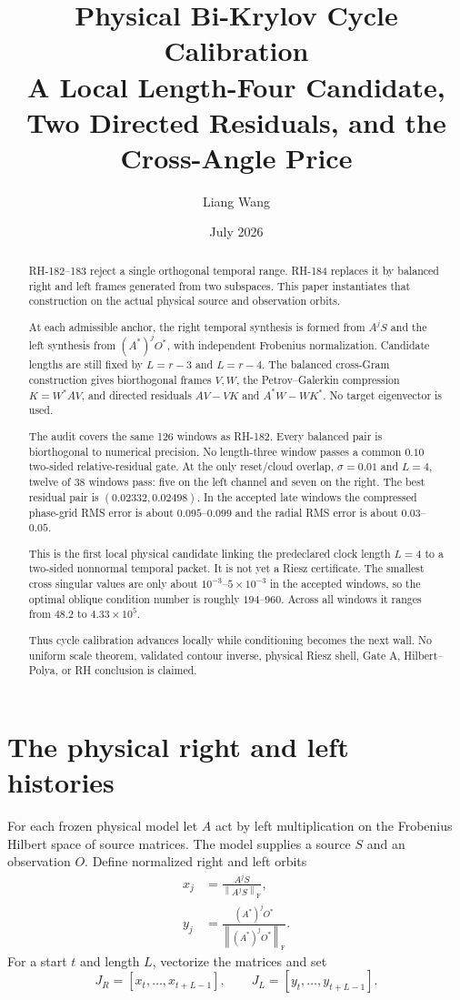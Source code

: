 \documentclass[12pt]{article}
\title{Physical Bi-Krylov Cycle Calibration\\
\large A Local Length-Four Candidate, Two Directed Residuals, and the Cross-Angle Price}
\author{Liang Wang}
\date{July 2026}
\theoremstyle{remark}
\newcommand{\norm}[1]{\left\lVert#1\right\rVert}
\begin{document}
\maketitle

\begin{abstract}
RH-182--183 reject a single orthogonal temporal range.  RH-184 replaces it by
balanced right and left frames generated from two subspaces.  This paper
instantiates that construction on the actual physical source and observation
orbits.

At each admissible anchor, the right temporal synthesis is formed from
$A^jS$ and the left synthesis from $(A^*)^jO^*$, with independent Frobenius
normalization.  Candidate lengths are still fixed by $L=r-3$ and $L=r-4$.
The balanced cross-Gram construction gives biorthogonal frames $V,W$, the
Petrov--Galerkin compression $K=W^*AV$, and directed residuals
$AV-VK$ and $A^*W-WK^*$.  No target eigenvector is used.

The audit covers the same 126 windows as RH-182.  Every balanced pair is
biorthogonal to numerical precision.  No length-three window passes a common
$0.10$ two-sided relative-residual gate.  At the only reset/cloud overlap,
$\sigma=0.01$ and $L=4$, twelve of 38 windows pass: five on the left channel
and seven on the right.  The best residual pair is
$(0.02332,0.02498)$.  In the accepted late windows the compressed phase-grid
RMS error is about $0.095$--$0.099$ and the radial RMS error is about
$0.03$--$0.05$.

This is the first local physical candidate linking the predeclared clock
length $L=4$ to a two-sided nonnormal temporal packet.  It is not yet a Riesz
certificate.  The smallest cross singular values are only about
$10^{-3}$--$5\times10^{-3}$ in the accepted windows, so the optimal oblique
condition number is roughly $194$--$960$.  Across all windows it ranges from
$48.2$ to $4.33\times10^5$.

Thus cycle calibration advances locally while conditioning becomes the next
wall.  No uniform scale theorem, validated contour inverse, physical Riesz
shell, Gate A, Hilbert--Polya, or RH conclusion is claimed.
\end{abstract}

\section{The physical right and left histories}

For each frozen physical model let $A$ act by left multiplication on the
Frobenius Hilbert space of source matrices.  The model supplies a source
$S$ and an observation $O$.  Define normalized right and left orbits
\begin{align}
 x_j&=\frac{A^jS}{\norm{A^jS}_{\mathrm F}},
 \label{eq:right-orbit}\\
 y_j&=\frac{(A^*)^jO^*}{\norm{(A^*)^jO^*}_{\mathrm F}}.
 \label{eq:left-orbit}
\end{align}
For a start $t$ and length $L$, vectorize the matrices and set
\begin{equation}\label{eq:syntheses}
 J_R=[x_t,\ldots,x_{t+L-1}],
 \qquad
 J_L=[y_t,\ldots,y_{t+L-1}].
\end{equation}
\end{document}
